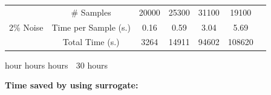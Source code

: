 \documentclass{beamer}
\begin{document}
\begin{frame}[t]
\begin{itemize}[leftmargin=5pt]
\begin{table}[ht]
\begin{threeparttable}
{\begin{tabular}{|c|c|c|c|c|c|c|}
        \multirow{3}{*}{2\% Noise}
        & \# Samples &20000&25300&31100&19100\\
        \cline{2-6}
        &Time per Sample (s.) & 0.16 & 0.59 & 3.04 & 5.69\\
        \cline{2-6}
        &Total Time (s.) &3264& 14911&94602&108620\\
        \hline
        \end{tabular}}
        \begin{tablenotes}
        \vspace{-2mm}
        {\fontsize{7}{3}\selectfont
        \item \qquad \qquad\qquad\qquad \qquad\qquad \quad\quad\quad\quad\quad\quad{} hour \quad{} hours  hours $\;$ 30 hours
        }
        \end{tablenotes}
        \end{threeparttable}
    \end{table}

\vspace{4mm}
    \textcolor{myred}{\bf Time saved by using surrogate:}

    \vspace{-6mm}
    \begin{table}[ht]
    \centering
    \end{table}


\end{itemize}
\end{frame}
\end{document}
